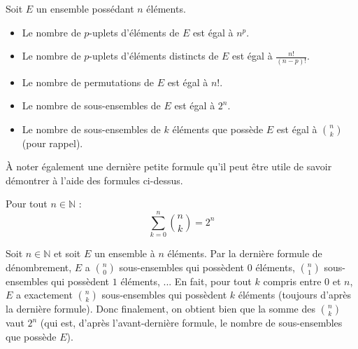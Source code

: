 	\begin{formula}[Formules]
		Soit $E$ un ensemble possédant $n$ éléments.
		\begin{itemize}
			\item Le nombre de $p$-uplets d'éléments de $E$ est égal à $n^p$.
			\item Le nombre de $p$-uplets d'éléments distincts de $E$ est égal à $\frac{n!}{(n-p)!}$.
			\item Le nombre de permutations de $E$ est égal à $n!$.
			\item Le nombre de sous-ensembles de $E$ est égal à $2^n$.
			\item Le nombre de sous-ensembles de $k$ éléments que possède $E$ est égal à $\binom{n}{k}$ (pour rappel).
		\end{itemize}
	\end{formula}
	
	\begin{nosummary}
		À noter également une dernière petite formule qu'il peut être utile de savoir démontrer à l'aide des formules ci-dessus.
		
		\begin{formula}
			Pour tout $n \in \mathbb{N}$ :
			\[ \sum_{k = 0}^n \binom{n}{k} = 2^n \]
		\end{formula}
		
		\begin{demonstration}
			Soit $n \in \mathbb{N}$ et soit $E$ un ensemble à $n$ éléments.
			\newpar
			Par la dernière formule de dénombrement, $E$ a $\binom{n}{0}$ sous-ensembles qui possèdent $0$ éléments, $\binom{n}{1}$ sous-ensembles qui possèdent $1$ éléments, ...
			\newpar
			En fait, pour tout $k$ compris entre $0$ et $n$, $E$ a exactement $\binom{n}{k}$ sous-ensembles qui possèdent $k$ éléments (toujours d'après la dernière formule).
			\newpar
			Donc finalement, on obtient bien que la somme des $\binom{n}{k}$ vaut $2^n$ (qui est, d'après l'avant-dernière formule, le nombre de sous-ensembles que possède $E$).
		\end{demonstration}
	\end{nosummary}
